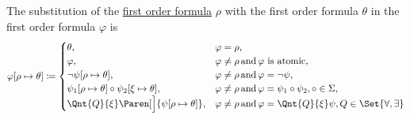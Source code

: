 \begin{definition}
\begin{DefEnum}
    The substitution of the \hyperref[def:first_order_syntax/formula]{first order formula} \( \rho \) with the first order formula \( \theta \) in the first order formula \( \varphi \) is
    \begin{equation}\label{eq:def:first_order_substitution/formula_in_formula}
      \varphi[\rho \mapsto \theta] \coloneqq \begin{cases}
        \theta,                                                       &\varphi = \rho, \\
        \varphi,                                                      &\varphi \neq \rho \T{and} \varphi \text{ is atomic}, \\
        \neg \psi[\rho \mapsto \theta],                               &\varphi \neq \rho \T{and} \varphi = \neg \psi, \\
        \psi_1[\rho \mapsto \theta] \circ \psi_2[\xi \mapsto \theta], &\varphi \neq \rho \T{and} \varphi = \psi_1 \circ \psi_2, \circ \in \Sigma, \\
        \Qnt{Q}{\xi} \Paren[\Big]{\psi[\rho \mapsto \theta]},     &\varphi \neq \rho \T{and} \varphi = \Qnt{Q}{\xi} \psi, Q \in \Set{ \forall, \exists }
      \end{cases}
    \end{equation}
  \end{DefEnum}
\end{definition}

